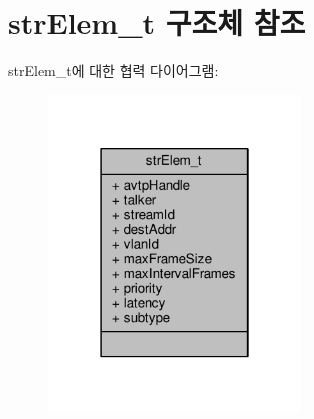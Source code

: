 \hypertarget{structstr_elem__t}{}\section{str\+Elem\+\_\+t 구조체 참조}
\label{structstr_elem__t}


str\+Elem\+\_\+t에 대한 협력 다이어그램\+:
\nopagebreak
\begin{figure}[H]
\begin{center}
\leavevmode
\includegraphics[width=190pt]{structstr_elem__t__coll__graph}
\end{center}
\end{figure}
